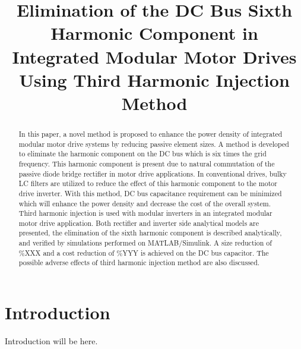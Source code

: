 \documentclass[conference,a4paper,twocolumn]{IEEEtran}
\begin{document}
\title{Elimination of the DC Bus Sixth Harmonic Component in Integrated Modular Motor Drives Using Third Harmonic Injection Method}
\author{
\and
{}
}
\maketitle
\begin{abstract}
In this paper, a novel method is proposed to enhance the power density of integrated modular motor drive systems by reducing passive element sizes. A method is developed to eliminate the harmonic component on the DC bus which is six times the grid frequency. This harmonic component is present due to natural commutation of the passive diode bridge rectifier in motor drive applications. In conventional drives, bulky LC filters are utilized to reduce the effect of this harmonic component to the motor drive inverter. With this method, DC bus capacitance requirement can be minimized which will enhance the power density and decrease the cost of the overall system. Third harmonic injection is used with modular inverters in an integrated modular motor drive application. Both rectifier and inverter side analytical models are presented, the elimination of the sixth harmonic component is described analytically, and verified by simulations performed on MATLAB/Simulink. A size reduction of \%XXX and a cost reduction of \%YYY is achieved on the DC bus capacitor. The possible adverse effects of third harmonic injection method are also discussed.
\end{abstract}
\IEEEpeerreviewmaketitle



\section{Introduction}

Introduction will be here.
\end{document}
